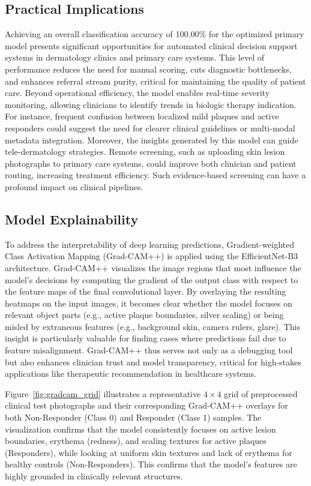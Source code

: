 \documentclass[11pt,journal,compsoc]{IEEEtran}
\begin{document}
\subsection{Practical Implications}
Achieving an overall classification accuracy of 100.00\% for the optimized primary model presents significant opportunities for automated clinical decision support systems in dermatology clinics and primary care systems. This level of performance reduces the need for manual scoring, cuts diagnostic bottlenecks, and enhances referral stream purity, critical for maintaining the quality of patient care. Beyond operational efficiency, the model enables real-time severity monitoring, allowing clinicians to identify trends in biologic therapy indication. For instance, frequent confusion between localized mild plaques and active responders could suggest the need for clearer clinical guidelines or multi-modal metadata integration. Moreover, the insights generated by this model can guide tele-dermatology strategies. Remote screening, such as uploading skin lesion photographs to primary care systems, could improve both clinician and patient routing, increasing treatment efficiency. Such evidence-based screening can have a profound impact on clinical pipelines.

\subsection{Model Explainability}
To address the interpretability of deep learning predictions, Gradient-weighted Class Activation Mapping (Grad-CAM++) is applied using the EfficientNet-B3 architecture. Grad-CAM++ visualizes the image regions that most influence the model’s decisions by computing the gradient of the output class with respect to the feature maps of the final convolutional layer. By overlaying the resulting heatmaps on the input images, it becomes clear whether the model focuses on relevant object parts (e.g., active plaque boundaries, silver scaling) or being misled by extraneous features (e.g., background skin, camera rulers, glare). This insight is particularly valuable for finding cases where predictions fail due to feature misalignment. Grad-CAM++ thus serves not only as a debugging tool but also enhances clinician trust and model transparency, critical for high-stakes applications like therapeutic recommendation in healthcare systems.

Figure~\ref{fig:gradcam_grid} illustrates a representative $4 \times 4$ grid of preprocessed clinical test photographs and their corresponding Grad-CAM++ overlays for both Non-Responder (Class 0) and Responder (Class 1) samples. The visualization confirms that the model consistently focuses on active lesion boundaries, erythema (redness), and scaling textures for active plaques (Responders), while looking at uniform skin textures and lack of erythema for healthy controls (Non-Responders). This confirms that the model's features are highly grounded in clinically relevant structures.
\end{document}
